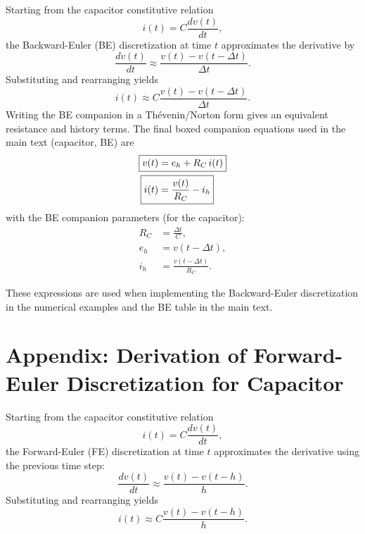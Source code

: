 Starting from the capacitor constitutive relation
\begin{equation}
    i(t) = C\frac{dv(t)}{dt},
\end{equation}
the Backward-Euler (BE) discretization at time $t$ approximates the derivative by
\begin{equation}
    \frac{dv(t)}{dt} \approx \frac{v(t) - v(t-\Delta t)}{\Delta t}.
\end{equation}
Substituting and rearranging yields
\begin{equation}
    i(t) \approx C\frac{v(t)-v(t-\Delta t)}{\Delta t}.
\end{equation}
Writing the BE companion in a Thévenin/Norton form gives an equivalent resistance and history terms. The final boxed companion equations used in the main text (capacitor, BE) are
\begin{align}
    \Aboxed{v(t) &= e_h + R_C\, i(t)} \label{eq:vt_cap_be_app} \\
    \Aboxed{i(t) &= \frac{v(t)}{R_C} - i_h} \label{eq:it_cap_be_app}
\end{align}
with the BE companion parameters (for the capacitor):
\begin{align}
    R_C &= \frac{\Delta t}{C}, \\
    e_h &= v(t-\Delta t), \\
    i_h &= \frac{v(t-\Delta t)}{R_C}.
\end{align}

These expressions are used when implementing the Backward-Euler discretization in the numerical examples and the BE table in the main text.

\clearpage
\section{Appendix: Derivation of Forward-Euler Discretization for Capacitor} \label{sec:appendix_cap_fe}

Starting from the capacitor constitutive relation
\begin{equation}
    i(t) = C\frac{dv(t)}{dt},
\end{equation}
the Forward-Euler (FE) discretization at time $t$ approximates the derivative using the previous time step:
\begin{equation}
    \frac{dv(t)}{dt} \approx \frac{v(t) - v(t-h)}{h}.
\end{equation}
Substituting and rearranging yields
\begin{equation}
    i(t) \approx C\frac{v(t)-v(t-h)}{h}.
\end{equation}

